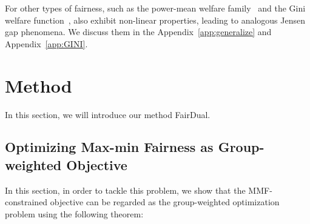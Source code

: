 For other types of fairness, such as the power-mean welfare family~\citep{cousins2021axiomatic} and the Gini welfare function~\citep{do2022optimizing}, also exhibit non-linear properties, leading to analogous Jensen gap phenomena. We discuss them in the Appendix~\ref{app:generalize} and Appendix~\ref{app:GINI}.






\section{Method}
In this section, we will introduce our method FairDual.



\subsection{Optimizing Max-min Fairness as Group-weighted Objective}
In this section, in order to tackle this problem, we show that the MMF-constrained objective can be regarded as the group-weighted optimization problem using the following theorem:

